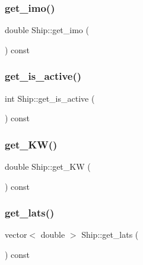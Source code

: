 \mbox{\label{class_ship_a3b33ce198d3e5db2e5a06a8606d99df9}} 
\subsubsection{\texorpdfstring{get\_imo()}{get\_imo()}}
{\footnotesize\ttfamily double Ship\+::get\+\_\+imo (\begin{DoxyParamCaption}{ }\end{DoxyParamCaption}) const}

\mbox{\label{class_ship_a363fe0b03679729aed983b12c55ac68b}} 
\subsubsection{\texorpdfstring{get\_is\_active()}{get\_is\_active()}}
{\footnotesize\ttfamily int Ship\+::get\+\_\+is\+\_\+active (\begin{DoxyParamCaption}{ }\end{DoxyParamCaption}) const}

\mbox{\label{class_ship_af2069867a366ae1c419abc83c8997525}} 
\subsubsection{\texorpdfstring{get\_KW()}{get\_KW()}}
{\footnotesize\ttfamily double Ship\+::get\+\_\+\+KW (\begin{DoxyParamCaption}{ }\end{DoxyParamCaption}) const}

\mbox{\label{class_ship_a9ea443d338a4eef825f745bc5a4f8096}} 
\subsubsection{\texorpdfstring{get\_lats()}{get\_lats()}}
{\footnotesize\ttfamily vector$<$ double $>$ Ship\+::get\+\_\+lats (\begin{DoxyParamCaption}{ }\end{DoxyParamCaption}) const}

